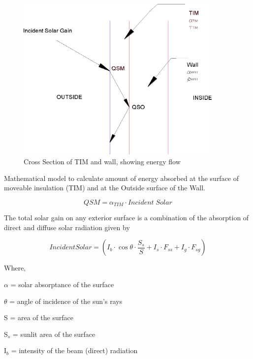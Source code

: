 \begin{figure}[hbtp] %
\centering
\includegraphics[width=0.9\textwidth, height=0.9\textheight, keepaspectratio=true]{media/image401.png}
\caption{Cross Section of TIM and wall, showing energy flow \protect \label{fig:cross-section-of-tim-and-wall-showing-energy}}
\end{figure}

Mathematical model to calculate amount of energy absorbed at the surface of moveable insulation (TIM) and at the Outside surface of the Wall.

\begin{equation}
QSM = {\alpha_{TIM}}\cdot Incident\;Solar
\label{eq:QSMalphaIncSolar}
\end{equation}

The total solar gain on any exterior surface is a combination of the absorption of direct and diffuse solar radiation given by

\begin{equation}
IncidentSolar = ({I_b}\cdot \cos \theta \cdot \frac{{{S_s}}}{S} + {I_s}\cdot {F_{ss}} + {I_g}\cdot {F_{sg}})
\end{equation}

Where,

$\alpha$ = solar absorptance of the surface

$\theta$ = angle of incidence of the sun's rays

S = area of the surface

S\(_{s}\) = sunlit area of the surface

I\(_{b}\) = intensity of the beam (direct) radiation


